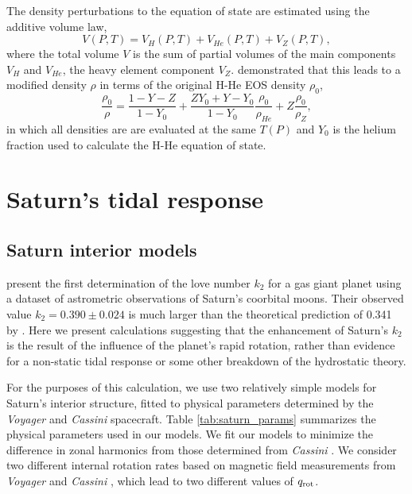 The density perturbations to the equation of state are estimated using the additive
volume law,
%
\begin{equation} 
   V(P, T) = V_H(P, T) + V_{He}(P, T) + V_{Z}(P,T),
\label{eq:volume_law}
\end{equation}
%
where the total volume $V$ is the sum of partial volumes of the main components $V_H$
and $V_{He}$, the heavy element component $V_Z$. \citet{hubbard2016} demonstrated
that this leads to a modified density $\rho$ in terms of the original H-He EOS
density $\rho_0$,
%
\begin{equation} 
   \frac{\rho_0}{\rho} = \frac{1-Y-Z}{1-Y_0} + 
   \frac{ZY_0 + Y - Y_0}{1-Y_0}\frac{\rho_0}{\rho_{He}} + Z\frac{\rho_0}{\rho_Z},
\label{eq:density_ratio}
\end{equation}
%
in which all densities are are evaluated at the same $T(P)$ and $Y_0$ is the helium
fraction used to calculate the H-He equation of state.


\section{Saturn's tidal response} \label{saturn}

\subsection{Saturn interior models}

\citet{lainey2016} present the first determination of the love number $k_2$ for a gas
giant planet using a dataset of astrometric observations of Saturn's coorbital moons.
Their observed value $k_2=0.390 \pm 0.024$ is much larger than the theoretical
prediction of 0.341 by \citet{gavrilov1977}. Here we present calculations suggesting
that the enhancement of Saturn's $k_2$ is the result of the influence of the planet's
rapid rotation, rather than evidence for a non-static tidal response or some other
breakdown of the hydrostatic theory.

For the purposes of this calculation, we use two relatively simple models for
Saturn's interior structure, fitted to physical parameters determined by the
\textit{Voyager} and \textit{Cassini} spacecraft. Table \ref{tab:saturn_params}
summarizes the physical parameters used in our models. We fit our models to minimize
the difference in zonal harmonics from those determined from \textit{Cassini}
\citep{Jacobson2006}.  We consider two different internal rotation rates based on
magnetic field measurements from \textit{Voyager} \citep{desch1981} and
\textit{Cassini} \citep{giampieri2006}, which lead to two different values of $q_{\rm
rot}$. 

